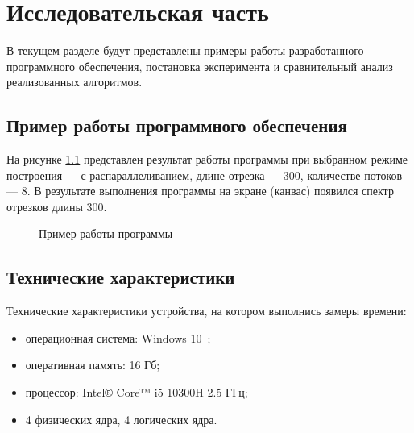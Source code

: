 \chapter{Исследовательская часть}
В текущем разделе будут представлены примеры работы разработанного программного обеспечения, постановка эксперимента и сравнительный анализ реализованных алгоритмов.

\section{Пример работы программного обеспечения}

На рисунке \ref{fig:prog_exmpl} представлен результат работы программы при выбранном режиме построения --- с распараллеливанием, длине отрезка --- 300, количестве потоков --- 8. В результате выполнения программы на экране (канвас) появился спектр отрезков длины 300.

\begin{figure}[h!]
	
	
	\caption{Пример работы программы}
	
	\label{fig:prog_exmpl}
	
\end{figure}

\section{Технические характеристики}

Технические характеристики устройства, на котором выполнись замеры времени:

\begin{itemize}
	\item операционная система: Windows 10~\cite{windows10};
	\item оперативная память: 16 Гб;
	\item процессор: Intel® Core™ i5 10300H 2.5 ГГц;
	\item 4 физических ядра, 4 логических ядра.
\end{itemize}

